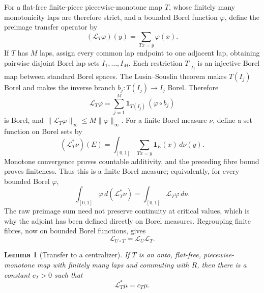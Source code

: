 \documentclass[11pt]{article}
\newtheorem{lemma}[theorem]{Lemma}
\theoremstyle{definition}
\theoremstyle{remark}
\newcommand{\I}{[0,1]}
\begin{document}
For a flat-free finite-piece piecewise-monotone map \(T\), whose finitely many
monotonicity laps are therefore strict, and a bounded Borel function
\(\varphi\), define the preimage transfer operator by
\[
 (\mathcal L_T\varphi)(y)=\sum_{Tx=y}\varphi(x).
\]
If \(T\) has \(M\) laps, assign every common lap endpoint to one adjacent lap,
obtaining pairwise disjoint Borel lap sets \(I_1,\ldots,I_M\).  Each
restriction \(T|_{I_j}\) is an injective Borel map between standard Borel
spaces.  The Lusin--Souslin theorem makes \(T(I_j)\) Borel and makes the
inverse branch \(b_j:T(I_j)\to I_j\) Borel.  Therefore
\[
 \mathcal L_T\varphi
 =\sum_{j=1}^M
   \mathbf1_{T(I_j)}\,(\varphi\circ b_j)
\]
is Borel, and
\(\|\mathcal L_T\varphi\|_\infty\leq M\|\varphi\|_\infty\).  For a finite
Borel measure \(\nu\), define a set function on Borel sets by
\begin{equation}\label{eq:pl-transfer-adjoint-definition}
 (\mathcal L_T^*\nu)(E)
 =\int_{\I}\sum_{Tx=y}\mathbf 1_E(x)\,d\nu(y).
\end{equation}
Monotone convergence proves countable additivity, and the preceding fibre
bound proves finiteness.  Thus this is a finite Borel measure; equivalently,
for every bounded Borel \(\varphi\),
\[
 \int_{\I}\varphi\,d(\mathcal L_T^*\nu)
 =\int_{\I}\mathcal L_T\varphi\,d\nu.
\]
The raw preimage sum need not preserve continuity at critical values, which
is why the adjoint has been defined directly on Borel measures.  Regrouping
finite fibres, now on bounded Borel functions, gives
\begin{equation}\label{eq:pl-transfer-composition}
 \mathcal L_{U\circ T}=\mathcal L_U\mathcal L_T.
\end{equation}

\begin{lemma}[Transfer to a centralizer]\label{lem:pl-transfer}
If \(T\) is an onto, flat-free, piecewise-monotone map with finitely many laps
and commuting with \(R\), then there is a constant \(c_T>0\) such that
\[
 \mathcal L_T^*\mu=c_T\mu.
\]
\end{lemma}
\end{document}
